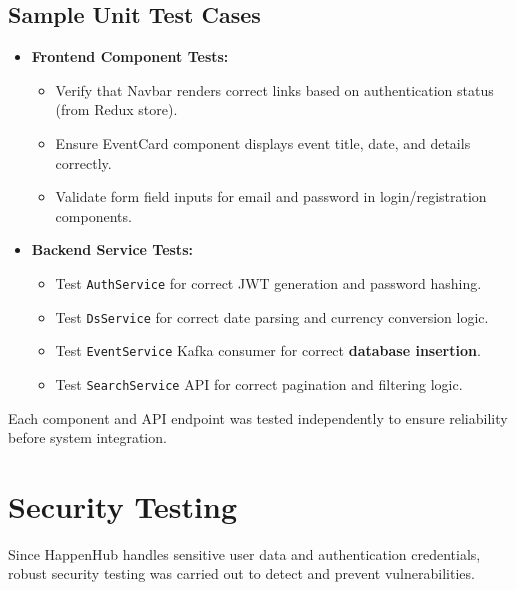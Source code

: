 \documentclass[12pt,a4paper]{report}
\begin{document}
\subsection*{Sample Unit Test Cases}
\begin{itemize}
    \item \textbf{Frontend Component Tests:}
          \begin{itemize}
              \item Verify that Navbar renders correct links based on authentication status (from Redux store).
              \item Ensure EventCard component displays event title, date, and details correctly.
              \item Validate form field inputs for email and password in login/registration components.
          \end{itemize}
    \item \textbf{Backend Service Tests:}
          \begin{itemize}
              \item Test \texttt{AuthService} for correct JWT generation and password hashing.
              \item Test \texttt{DsService} for correct date parsing and currency conversion logic.
              \item Test \texttt{EventService} Kafka consumer for correct \textbf{database insertion}.
              \item Test \texttt{SearchService} API for correct pagination and filtering logic.
          \end{itemize}
\end{itemize}

\noindent
Each component and API endpoint was tested independently to ensure reliability before system integration.

\section{Security Testing}

Since HappenHub handles sensitive user data and authentication credentials,
robust security testing was carried out to detect and prevent vulnerabilities.
\end{document}

